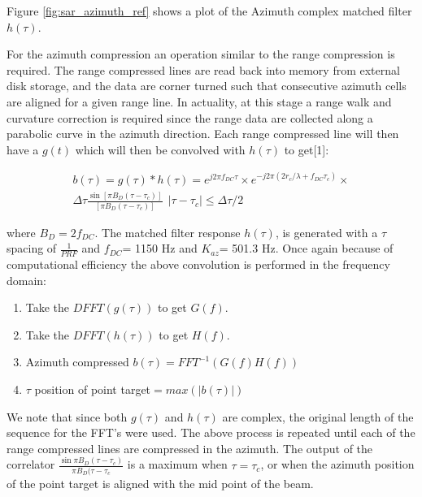 \par

Figure \ref{fig:sar_azimuth_ref} shows a plot of the Azimuth complex matched filter $h(\tau)$.

\par

For the azimuth compression an operation similar to the range compression is required. The range compressed lines are read back into memory from external disk storage, and the data are corner turned such that consecutive azimuth cells are aligned for a given range line. In actuality, at this stage a range walk and curvature correction is required since the range data are collected along a parabolic curve in the azimuth direction. Each range compressed line will then have a $g(t)$ which will then be convolved with $h(\tau)$ to get[1]:


\begin{equation}
\label{ }
\begin{split}
b(\tau)=g(\tau)* h(\tau) = e^{j2\pi f_{DC}\tau} 
\times   e^{-j2\pi (2r_c/\lambda + f_{DC} \tau_c)}     \times \\
\Delta  \tau \frac{\sin \left [ \pi B_D (\tau -\tau_c) \right ] }{[\pi B_D (\tau -\tau_c)] }~~ | \tau -\tau_c| \leq \Delta \tau /2
\end{split}
\end{equation}



where $B_D= 2 f_{DC} $. The matched filter response $h(\tau)$, is generated with a $\tau$ spacing of $\frac{1}{PRF}$ and $f_{DC} $= 1150 Hz and $ K_{az}$= 501.3  Hz. Once again because of computational efficiency the above convolution is performed in the frequency domain:

\begin{enumerate}
\item  Take the $DFFT(g(\tau)) $ to get $G(f)$.
\item  Take the $DFFT(h(\tau)) $ to get $H(f)$.
\item  Azimuth compressed $b(\tau) = FFT^{-1} \left ( G(f)H(f) \right ) $
\item   $\tau $ position of point target$= max \left  ( | b(\tau ) | \right )$
\end{enumerate}



We note that since both $g(\tau)$ and $h(\tau)$ are complex, the original length of the sequence for the FFT's were used. The above process is repeated until each of the range compressed lines are compressed in the azimuth. The output of the correlator $\frac{\sin \pi B_D(\tau -\tau_c)}{\pi B_D(\tau -\tau_c}$ is a maximum when $\tau =\tau_c$, or when the azimuth position of the point target is aligned with the mid point of the beam. 



